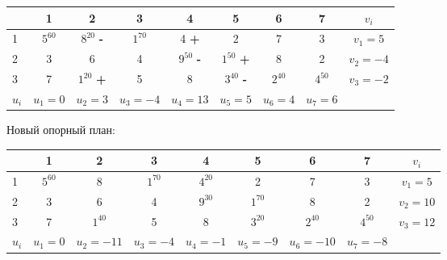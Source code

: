 \begin{center}
    \begin{tabular}{|a | c | c | c | c | c | c | c | c|} 
         \hline
            & 1 & 2 & 3 & 4 & 5 & 6 & 7 & $v_{i}$\\
          &  $5^{60}$ &  $8^{20}$ {\bf-} &  $1^{70}$ & 4 {\bf+} & 2 & 7 & 3 & $v_1 = 5$\\
          & 3 & 6 & 4 &  $9^{50}$ {\bf-} &  $1^{50}$ {\bf+} & 8 & 2 & $v_2 = -4$\\
          & 7 &  $1^{20}$ {\bf+} & 5 & 8 &  $3^{40}$ {\bf-} &  $2^{40}$ &  $4^{50}$ & $v_3 = -2$\\
         \hline
            $u_{i}$ & $u_1 = 0$ & $u_2 = 3$ & $u_3 = -4$ & $u_4 = 13$ & $u_5 = 5$ & $u_6 = 4$ & $u_7 = 6$ & \\
        \hline
    \end{tabular}
\end{center}

Новый опорный план:
\begin{center}
    \begin{tabular}{|a | c | c | c | c | c | c | c | c|} 
         \hline
            & 1 & 2 & 3 & 4 & 5 & 6 & 7 & $v_{i}$\\
          &  $5^{60}$ & 8 &  $1^{70}$ &  $4^{20}$ & 2 & 7 & 3 & {\small$v_1 = 5$}\\
          & 3 & 6 & 4 &  $9^{30}$ &  $1^{70}$ & 8 & 2 & {\small$v_2 = 10$}\\
          & 7 &  $1^{40}$ & 5 & 8 &  $3^{20}$ &  $2^{40}$ &  $4^{50}$ & {\small$v_3 = 12$}\\
         \hline
            $u_{i}$ & {\small$u_1 = 0$} & {\small$u_2 = -11$} & {\small$u_3 = -4$} & {\small$u_4 = -1$} & {\small$u_5 = -9$} & {\small$u_6 = -10$} & {\small$u_7 = -8$} & \\
        \hline
    \end{tabular}
\end{center}


